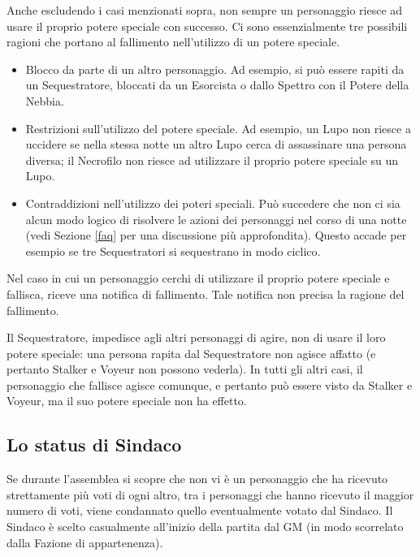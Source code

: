 \documentclass[a4paper,10pt]{article}
\begin{document}
Anche escludendo i casi menzionati sopra, non sempre un personaggio riesce ad usare il proprio potere speciale con successo.
Ci sono essenzialmente tre possibili ragioni che portano al fallimento nell'utilizzo di un potere speciale.
\begin{itemize}
 \item Blocco da parte di un altro personaggio. Ad esempio, si può essere rapiti da un Sequestratore, bloccati da un Esorcista o dallo Spettro con il Potere della Nebbia.
 \item Restrizioni sull'utilizzo del potere speciale. Ad esempio, un Lupo non riesce a uccidere se nella stessa notte un altro Lupo cerca di assassinare una persona diversa; il Necrofilo non riesce ad utilizzare il proprio potere speciale su un Lupo.
 \item Contraddizioni nell'utilizzo dei poteri speciali. Può succedere che non ci sia alcun modo logico di risolvere le azioni dei personaggi nel corso di una notte (vedi Sezione \ref{faq} per una discussione più approfondita). Questo accade per esempio se tre Sequestratori si sequestrano in modo ciclico.
\end{itemize}

Nel caso in cui un personaggio cerchi di utilizzare il proprio potere speciale e fallisca, riceve una notifica di fallimento. Tale notifica non precisa la ragione del fallimento.

Il Sequestratore, impedisce agli altri personaggi di agire, non di usare il loro potere speciale: una persona rapita dal Sequestratore non agisce affatto (e pertanto Stalker e Voyeur non possono vederla).
In tutti gli altri casi, il personaggio che fallisce agisce comunque, e pertanto può essere visto da Stalker e Voyeur, ma il suo potere speciale non ha effetto. 


\subsection{Lo status di Sindaco}
\label{sindaco}

Se durante l'assemblea si scopre che non vi è un personaggio che ha ricevuto strettamente più voti di ogni altro, tra i personaggi che hanno ricevuto il maggior numero di voti, viene condannato quello eventualmente votato dal Sindaco.
Il Sindaco è scelto casualmente all'inizio della partita dal GM (in modo scorrelato dalla Fazione di appartenenza).
\end{document}
